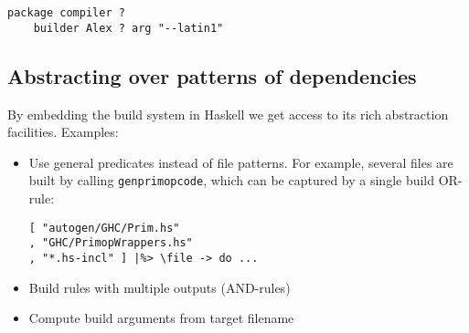 \begin{verbatim}
package compiler ?
    builder Alex ? arg "--latin1"
\end{verbatim}

\subsection{Abstracting over patterns of dependencies}


By embedding the build system in Haskell we get access to its rich abstraction
facilities. Examples:
\begin{itemize}
  \item Use general predicates instead of file patterns. For example, several
  files are built by calling \texttt{genprimopcode}, which can be captured by a
  single build OR-rule:

\begin{lstlisting}[basicstyle=\ttfamily]
[ "autogen/GHC/Prim.hs"
, "GHC/PrimopWrappers.hs"
, "*.hs-incl" ] |%> \file -> do ...
\end{lstlisting}

  \item Build rules with multiple outputs (AND-rules)
  \item Compute build arguments from target filename
\end{itemize}

\newcommand{\itab}[1]{\hspace{0em}\rlap{#1}}
\newcommand{\tab}[1]{\hspace{.12\textwidth}\rlap{#1}}
\newcommand{\ctab}[1]{\hspace{.031\textwidth}\rlap{#1}}
\newcommand{\ptab}[1]{\hspace{.074\textwidth}\rlap{#1}}
\newcommand{\cotab}[1]{\hspace{.064\textwidth}\rlap{#1}}
\newcommand{\ttab}[1]{\hspace{.058\textwidth}\rlap{#1}}
\newcommand{\tytab}[1]{\hspace{.052\textwidth}\rlap{#1}}
\newcommand{\atab}[1]{\hspace{.102\textwidth}\rlap{#1}}

